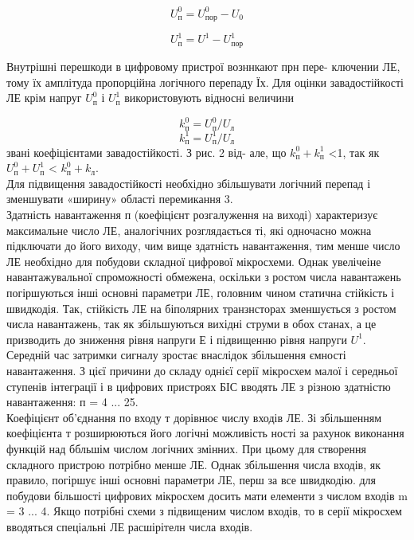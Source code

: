 \documentclass[a4paper,14pt]{extreport}
\begin{document}
  $$U_{\text{п}}^0 = U_{\text{пор}}^0 - U_0$$

  $$U_{\text{п}}^1 = U^1 - U_{\text{пор}}^1$$

  Внутрішні перешкоди в цифровому пристрої возннкают прн пере-
  ключении ЛЕ, тому їх амплітуда пропорційна логічного перепаду Їх. Для оцінки завадостійкості ЛЕ крім напруг
  $U_{\text{п}}^0$ і $U_{\text{п}}^1$ використовують відносні величини

  $$k_{\text{п}}^0 = U_{\text{п}}^0/U_{\text{л}}$$
  $$k_{\text{п}}^1 = U_{\text{п}}^1/U_{\text{л}}$$
  звані коефіцієнтами завадостійкості. З рис. 2 від-
  але, що $k_{\text{п}}^0 + k_{\text{п}}^1$ <1, так як $U_{\text{п}}^0 + U_{\text{п}}^1$ < $k_{\text{п}}^0 + k_{\text{л}}$.\\

  Для підвищення завадостійкості необхідно збільшувати логічний перепад і зменшувати «ширину» області перемикання 3. \\

  Здатність навантаження п (коефіцієнт розгалуження на виході)
  характеризує максимальне число ЛЕ, аналогічних розглядається ті, які одночасно можна підключати до його виходу, чим
  вище здатність навантаження, тим менше число ЛЕ необхідно для
  побудови складної цифрової мікросхеми. Однак увелічеіне навантажувальної спроможності обмежена, оскільки з ростом числа навантажень погіршуються інші основні параметри ЛЕ, головним чином статична стійкість і швидкодія.
  Так, стійкість ЛЕ на біполярних транзнсторах зменшується з ростом числа навантажень, так як збільшуються вихідні струми в обох станах, а це призводить до зниження рівня напруги Е і підвищенню рівня напруги $U^1$. Середній час затримки сигналу зростає внаслідок збільшення ємності навантаження. З цієї причини до складу однієї серії мікросхем малої і середньої ступенів інтеграції і в цифрових пристроях БІС вводять ЛЕ з різною здатністю навантаження: п = 4 ... 25.\\

  Коефіцієнт об'єднання по входу т дорівнює числу входів ЛЕ.
  Зі збільшенням коефіцієнта т розширюються його логічні можливість ності за рахунок виконання функцій над ббльшім числом логічних змінних. При цьому для створення складного пристрою потрібно менше ЛЕ. Однак збільшення числа входів, як правило, погіршує інші основні параметри ЛЕ, перш за все швидкодію. для
  побудови більшості цифрових мікросхем досить мати елементи з числом входів m = 3 ... 4. Якщо потрібні схеми з підвищеним числом входів, то в серії мікросхем вводяться спеціальні ЛЕ расшірітелн числа входів.\\
\end{document}
